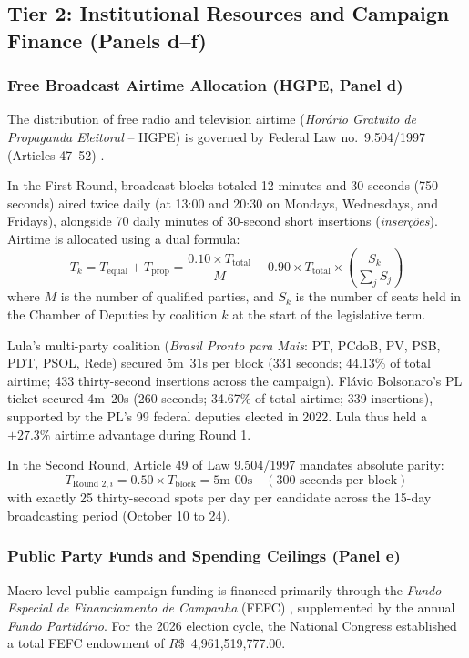 \subsection*{Tier 2: Institutional Resources and Campaign Finance (Panels d--f)}

\subsubsection*{Free Broadcast Airtime Allocation (HGPE, Panel d)}
The distribution of free radio and television airtime (\emph{Hor{\'a}rio Gratuito de Propaganda Eleitoral} -- HGPE) is governed by Federal Law no.\ 9.504/1997 (Articles 47--52) \citep{lei9504_1997}. 

In the First Round, broadcast blocks totaled 12 minutes and 30 seconds (750 seconds) aired twice daily (at 13:00 and 20:30 on Mondays, Wednesdays, and Fridays), alongside 70 daily minutes of 30-second short insertions (\emph{inser{\c{c}}{\~o}es}). Airtime is allocated using a dual formula:
\begin{equation}
T_k = T_{\text{equal}} + T_{\text{prop}} = \frac{0.10 \times T_{\text{total}}}{M} + 0.90 \times T_{\text{total}} \times \left(\frac{S_k}{\sum_j S_j}\right)
\end{equation}
where $M$ is the number of qualified parties, and $S_k$ is the number of seats held in the Chamber of Deputies by coalition $k$ at the start of the legislative term. 

Lula's multi-party coalition (\emph{Brasil Pronto para Mais}: PT, PCdoB, PV, PSB, PDT, PSOL, Rede) secured 5m~31s per block (331 seconds; 44.13\% of total airtime; 433 thirty-second insertions across the campaign). Fl{\'a}vio Bolsonaro's PL ticket secured 4m~20s (260 seconds; 34.67\% of total airtime; 339 insertions), supported by the PL's 99 federal deputies elected in 2022. Lula thus held a $+27.3\%$ airtime advantage during Round 1.

In the Second Round, Article 49 of Law 9.504/1997 mandates absolute parity:
\begin{equation}
T_{\text{Round 2}, i} = 0.50 \times T_{\text{block}} = 5\text{m } 00\text{s} \quad (300\text{ seconds per block})
\end{equation}
with exactly 25 thirty-second spots per day per candidate across the 15-day broadcasting period (October 10 to 24).

\subsubsection*{Public Party Funds and Spending Ceilings (Panel e)}
Macro-level public campaign funding is financed primarily through the \emph{Fundo Especial de Financiamento de Campanha} (FEFC) \citep{tse2026fefc}, supplemented by the annual \emph{Fundo Partid{\'a}rio}. For the 2026 election cycle, the National Congress established a total FEFC endowment of $R\$$~4,961,519,777.00. 


